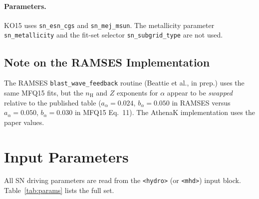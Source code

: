 \documentclass[11pt]{article}
\begin{document}
\paragraph{Parameters.}  KO15 uses \texttt{sn\_esn\_cgs} and
\texttt{sn\_mej\_msun}.  The metallicity parameter \texttt{sn\_metallicity}
and the fit-set selector \texttt{sn\_subgrid\_type} are not used.

\subsection{Note on the RAMSES Implementation}

The RAMSES \texttt{blast\_wave\_feedback} routine (Beattie et al., in prep.)
uses the same MFQ15 fits, but the $n_\mathrm{H}$ and $Z$ exponents for
$\alpha$ appear to be \emph{swapped} relative to the published table
($a_\alpha = 0.024$, $b_\alpha = 0.050$ in RAMSES versus $a_\alpha = 0.050$,
$b_\alpha = 0.030$ in MFQ15 Eq.~11).  The AthenaK implementation uses the
paper values.

\section{Input Parameters}

All SN driving parameters are read from the \texttt{<hydro>} (or
\texttt{<mhd>}) input block.  Table~\ref{tab:params} lists the full set.
\end{document}
